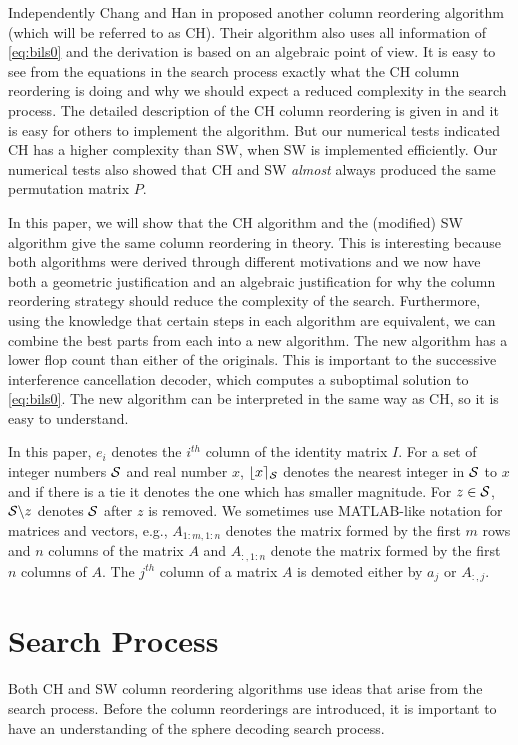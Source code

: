 \documentclass[conference]{IEEEtran}
\begin{document}
Independently  Chang and Han in \cite{ChaH05} proposed
another column reordering algorithm (which will be referred to as  CH).
Their algorithm also uses all information of \eqref{eq:bils0} and the derivation
is based on an algebraic point of view. It is  easy to see from the equations in
the search process exactly what the CH column reordering is doing and why we
should expect a reduced complexity in the search process. The detailed
description of the CH column reordering is given in \cite{ChaH05} and it is easy
for others to implement the algorithm.
But our numerical tests indicated CH has a  higher complexity than SW, when SW
is implemented efficiently.
Our numerical tests also showed that CH and SW {\em almost} always   
produced the same permutation matrix $P$.

In this paper, we will show that the CH algorithm and the  (modified)  SW algorithm give the same
column reordering in theory. 
This is interesting because both algorithms were derived through different motivations
and we now have both a geometric justification and an algebraic justification 
for why the column reordering strategy should reduce the complexity of the search.
Furthermore, using the knowledge that certain steps in each algorithm are equivalent,
we can combine the best parts from each into a new algorithm. The new algorithm
has a lower flop count than either of the originals.
This is important to the successive interference cancellation decoder, 
which computes a suboptimal solution to \eqref{eq:bils0}.
The new algorithm can be interpreted in the same way as CH,
so it is easy to understand.

In this paper,  $e_i$ denotes the $i^{th}$ column of the identity matrix $I$.
For a set of integer numbers ${\cal S}$ and real number $x$, 
$\lfloor x\rceil_{\cal S}$ denotes the nearest integer in  ${\cal S}$
to $x$ and if there is a tie it denotes the one which has smaller magnitude.
For $z\in{\cal S}$, ${\cal S}\backslash z$ denotes ${\cal S}$ after $z$ is removed.   
We sometimes use MATLAB-like notation for matrices and vectors, e.g.,
$A_{1:m,1:n}$ denotes the matrix formed by the first $m$ rows
and $n$ columns of the matrix $A$ and $A_{:,1:n}$ denote the matrix formed by
the first $n$ columns of $A$.
The $j^{th}$ column of a matrix $A$ is demoted either by $a_j$ or $A_{:,j}$.

\section{Search Process}
\label{sec:Search}
Both CH and SW column reordering algorithms use ideas that arise from the search
process. 
Before the column reorderings are introduced, it is
important to have an understanding of the sphere decoding search process. 
\end{document}
